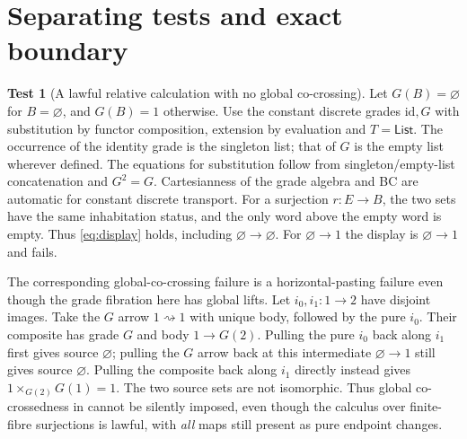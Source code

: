 \documentclass[11pt]{article}
\theoremstyle{definition}
\newtheorem{example}[theorem]{Test}
\newcommand{\id}{\mathrm{id}}
\begin{document}
\section{Separating tests and exact boundary}

\begin{example}[A lawful relative calculation with no global co-crossing]
Let $G(B)=\varnothing$ for $B=\varnothing$, and $G(B)=1$ otherwise.
Use the constant discrete grades $\id,G$ with substitution by functor
composition, extension by evaluation and $T=\mathsf{List}$.
The occurrence of the identity grade is the singleton list; that of $G$
is the empty list wherever defined. The equations for substitution follow
from singleton/empty-list concatenation and $G^2=G$. Cartesianness of
the grade algebra and BC are automatic for constant discrete transport.
For a surjection $r:E\to B$, the two sets have the same inhabitation
status, and the only word above the empty word is empty. Thus
\eqref{eq:display} holds, including $\varnothing\to\varnothing$.
For $\varnothing\to1$ the display is $\varnothing\to1$ and fails.

The corresponding global-co-crossing failure is a horizontal-pasting
failure even though the grade fibration here has global lifts.
Let $i_0,i_1:1\to2$ have disjoint images. Take the $G$ arrow
$1\rightsquigarrow1$ with unique body, followed by the pure $i_0$.
Their composite has grade $G$ and body $1\to G(2)$. Pulling the pure
$i_0$ back along $i_1$ first gives source $\varnothing$; pulling the
$G$ arrow back at this intermediate $\varnothing\to1$ still gives
source $\varnothing$. Pulling the composite back along $i_1$ directly
instead gives $1\times_{G(2)}G(1)=1$. The two source sets are not
isomorphic. Thus global co-crossedness in \cite[Def.~6.1]{BG} cannot be
silently imposed, even though the calculus over finite-fibre surjections
is lawful, with \emph{all} maps still present as pure endpoint changes.
\end{example}
\end{document}
